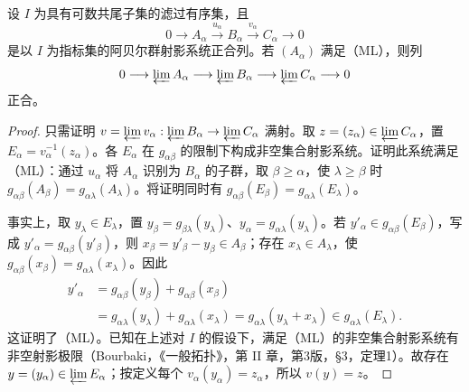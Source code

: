 设 $I$ 为具有可数共尾子集的滤过有序集，且
\[
0\longrightarrow A_\alpha\xrightarrow{u_\alpha}B_\alpha
\xrightarrow{v_\alpha}C_\alpha\longrightarrow0
\]
是以 $I$ 为指标集的阿贝尔群射影系统正合列。若 $(A_\alpha)$ 满足（ML），则列
\[
0\longrightarrow\varprojlim A_\alpha\longrightarrow\varprojlim B_\alpha
\longrightarrow\varprojlim C_\alpha\longrightarrow0
\]
正合。
\begin{proof}
只需证明 $v=\varprojlim v_\alpha:\varprojlim B_\alpha\to\varprojlim C_\alpha$ 满射。取 $z=(z_\alpha)\in\varprojlim C_\alpha$，置 $E_\alpha=v_\alpha^{-1}(z_\alpha)$。各 $E_\alpha$ 在 $g_{\alpha\beta}$ 的限制下构成非空集合射影系统。证明此系统满足（ML）：通过 $u_\alpha$ 将 $A_\alpha$ 识别为 $B_\alpha$ 的子群，取 $\beta\geq\alpha$，使 $\lambda\geq\beta$ 时 $g_{\alpha\beta}(A_\beta)=g_{\alpha\lambda}(A_\lambda)$。将证明同时有 $g_{\alpha\beta}(E_\beta)=g_{\alpha\lambda}(E_\lambda)$。

事实上，取 $y_\lambda\in E_\lambda$，置 $y_\beta=g_{\beta\lambda}(y_\lambda)$、$y_\alpha=g_{\alpha\lambda}(y_\lambda)$。若 $y'_\alpha\in g_{\alpha\beta}(E_\beta)$，写成 $y'_\alpha=g_{\alpha\beta}(y'_\beta)$，则 $x_\beta=y'_\beta-y_\beta\in A_\beta$；存在 $x_\lambda\in A_\lambda$，使 $g_{\alpha\beta}(x_\beta)=g_{\alpha\lambda}(x_\lambda)$。因此
\[
\begin{aligned}
y'_\alpha&=g_{\alpha\beta}(y_\beta)+g_{\alpha\beta}(x_\beta)\\
&=g_{\alpha\lambda}(y_\lambda)+g_{\alpha\lambda}(x_\lambda)
=g_{\alpha\lambda}(y_\lambda+x_\lambda)\in g_{\alpha\lambda}(E_\lambda).
\end{aligned}
\]
这证明了（ML）。已知在上述对 $I$ 的假设下，满足（ML）的非空集合射影系统有非空射影极限（Bourbaki，《一般拓扑》，第 II 章，第3版，§3，定理1）。故存在 $y=(y_\alpha)\in\varprojlim E_\alpha$；按定义每个 $v_\alpha(y_\alpha)=z_\alpha$，所以 $v(y)=z$。
\end{proof}

